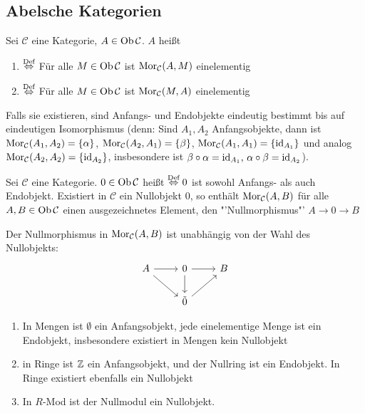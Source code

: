 \subsection{Abelsche Kategorien}
\begin{df}\label{5.1}
	Sei $\mathcal{C}$ eine Kategorie, $A\in \text{Ob}\,\mathcal{C}$. $A$ heißt
	\begin{enumerate}
		\item[]  $\overset{\text{Def}}{\Leftrightarrow}$ Für alle $M\in \text{Ob}\,\mathcal{C}$ ist $\text{Mor}_{\mathcal{C}}(A,M)$ einelementig
		\item[]  $\overset{\text{Def}}{\Leftrightarrow}$ Für alle $M\in \text{Ob}\,\mathcal{C}$ ist $\text{Mor}_{\mathcal{C}}(M,A)$ einelementig
	\end{enumerate}
\end{df}
\begin{anm}
	Falls sie existieren, sind Anfangs- und Endobjekte eindeutig bestimmt bis auf eindeutigen Isomorphismus (denn: Sind $A_1, A_2$ Anfangsobjekte, dann ist $\text{Mor}_{\mathcal{C}}(A_1, A_2) = \{\alpha\}$, $\text{Mor}_{\mathcal{C}}(A_2, A_1) = \{\beta\}$, $\text{Mor}_{\mathcal{C}}(A_1, A_1) = \{\operatorname{id}_{A_1}\}$ und analog $\text{Mor}_{\mathcal{C}}(A_2, A_2) = \{\operatorname{id}_{A_2}\}$, insbesondere ist $\beta \circ \alpha = \operatorname{id}_{A_1}, \, \alpha \circ \beta = \operatorname{id}_{A_2}$).
\end{anm}
\begin{df}\label{5.2}
	Sei $\mathcal{C}$ eine Kategorie. $0\in \text{Ob}\,\mathcal{C}$ heißt  $\overset{\text{Def}}{\Leftrightarrow} 0$ ist sowohl Anfangs- als auch Endobjekt. Existiert in $\mathcal{C}$ ein Nullobjekt $0$, so enthält $\text{Mor}_{\mathcal{C}}(A,B)$ für alle $A,B \in \text{Ob}\,\mathcal{C}$ einen ausgezeichnetes Element, den "'Nullmorphismus"' $ A \to 0 \to B$
\end{df}
\begin{anm}
	Der Nullmorphismus in $\text{Mor}_{\mathcal{C}}(A,B)$ ist unabhängig von der Wahl des Nullobjekts:
	$$\begin{tikzcd}
	A \arrow{r} \arrow{dr} & 0\arrow{d} \arrow{r} & B \\
	& \tilde{0} \arrow{ur} &
	\end{tikzcd}$$
\end{anm}
\begin{bsp}\label{5.3}
	\begin{enumerate}[label=\alph*)]
		\item In Mengen ist $\emptyset$ ein Anfangsobjekt, jede einelementige Menge ist ein Endobjekt, insbesondere existiert in Mengen kein Nullobjekt
		\item in Ringe ist $\mathbb{Z}$ ein Anfangsobjekt, und der Nullring ist ein Endobjekt. In Ringe existiert ebenfalls ein Nullobjekt
		\item In $R$-Mod ist der Nullmodul ein Nullobjekt.
	\end{enumerate}
\end{bsp}
